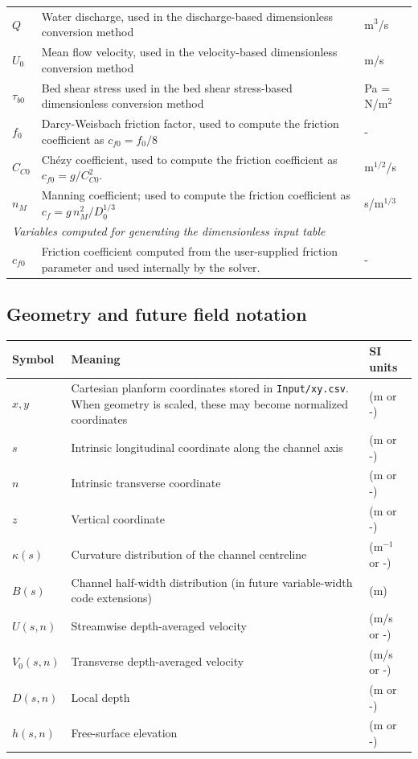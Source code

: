\documentclass[11pt,a4paper]{article}
\begin{document}
\begin{longtable}{p{} p{} >{\centering\arraybackslash}p{}}
$Q$           & Water discharge, used in the discharge-based dimensionless conversion method & m$^3$/s \\
$U_0$           & Mean flow velocity, used in the velocity-based dimensionless conversion method & m/s \\
$\tau_{b0}$      & Bed shear stress used in the bed shear stress-based dimensionless conversion  method & Pa = N/m$^2$ \\
$f_0$           & Darcy-Weisbach friction factor, used to compute the friction coefficient as  $c_{f0}=f_0/8$ & - \\
$C_{C0}$         & Ch\'ezy coefficient,  used to compute the friction coefficient as  $c_{f0}=g/C_{C0}^2$. & m$^{1/2}$/s \\
$n_M$ & Manning coefficient;  used to compute the friction coefficient as  $c_f = g \, n_M^2/D_0^{1/3}$ & s/m$^{1/3}$ \\
\midrule

\multicolumn{3}{l}{\textit{Variables computed for generating the dimensionless input table}} \\
\midrule
$c_{f0}$         & Friction coefficient computed from the user-supplied friction parameter and used internally by the solver. & - \\
\bottomrule
\end{longtable}


\subsection{Geometry and future field notation}

\begin{longtable}{p{} p{} >{\centering\arraybackslash}p{}}
\toprule
\textbf{Symbol} & \textbf{Meaning} & \textbf{SI units} \\
\midrule
\endhead
	$x,y$ & Cartesian planform coordinates stored in \texttt{Input/xy.csv}. When geometry is scaled, these may become normalized coordinates & (m or -) \\
	$s$ & Intrinsic longitudinal coordinate along the channel axis & (m or -) \\
	$n$ & Intrinsic transverse coordinate &  (m or -)\\
	$z$ & Vertical coordinate &  (m or -) \\
	$\kappa(s)$ & Curvature distribution of the channel centreline & (m$^{-1}$ or -)  \\
	$B(s)$ & Channel half-width distribution (in future variable-width code extensions) & (m) \\
	$U(s,n)$ & Streamwise depth-averaged velocity & (m/s or -) \\
	$V_0(s,n)$ & Transverse depth-averaged velocity  & (m/s or -) \\
	$D(s,n)$ & Local depth  & (m or -) \\
	$h(s,n)$ & Free-surface elevation & (m or -)  \\
\bottomrule
\end{longtable}
\end{document}
